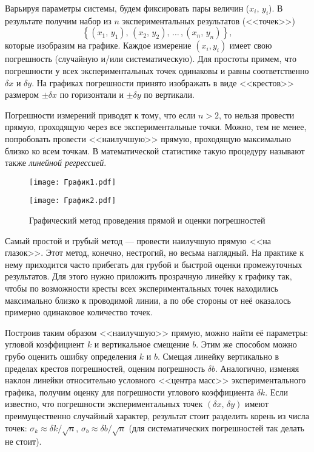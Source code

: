 \documentclass[10pt]{article}
\begin{document}
Варьируя параметры системы, будем фиксировать пары величин ($x_{i},\,y_{i}$).
В результате получим набор из $n$ экспериментальных результатов (<<точек>>)
\[
\left\{ (x_{1},\,y_{1}),\,(x_{2},\,y_{2}),\,\ldots\,,(x_{n},\,y_{n})\right\} ,
\]
которые изобразим на графике. Каждое измерение $\left(x_{i},y_{i}\right)$
имеет свою погрешность (случайную и/или систематическую). Для простоты
примем, что погрешности у всех экспериментальных точек одинаковы и
равны соответственно $\delta x$ и $\delta y$. На графиках погрешности
принято изображать в виде <<крестов>> размером
$\pm\delta x$ по горизонтали и $\pm\delta y$ по вертикали.

Погрешности измерений приводят к тому, что если $n>2$, то нельзя
провести прямую, проходящую через все экспериментальные точки. Можно,
тем не менее, попробовать провести <<наилучшую>>
прямую, проходящую максимально близко ко всем точкам. В математической
статистике такую процедуру называют также \emph{линейной регрессией}.

\begin{figure}[th]
\begin{minipage}[t]{0.5\columnwidth}%
\texttt{[image: График1.pdf]}%
\end{minipage}%
\begin{minipage}[t]{0.5\columnwidth}%
\texttt{[image: График2.pdf]}%
\end{minipage}

\caption{Графический метод проведения прямой и оценки погрешностей}
\end{figure}

Самый простой и грубый метод --- провести наилучшую прямую
<<на глазок>>. Этот метод, конечно, нестрогий,
но весьма наглядный. На практике к нему приходится часто прибегать
для грубой и быстрой оценки промежуточных результатов. Для этого нужно
приложить прозрачную линейку к графику так, чтобы по возможности кресты
всех экспериментальных точек находились максимально близко к проводимой
линии, а по обе стороны от неё оказалось примерно одинаковое количество
точек. 

Построив таким образом <<наилучшую>> прямую,
можно найти её параметры: угловой коэффициент $k$ и вертикальное
смещение $b$. Этим же способом можно грубо оценить ошибку определения
$k$ и $b$. Смещая линейку вертикально в пределах крестов погрешностей,
оценим погрешность $\delta b$. Аналогично, изменяя наклон линейки
относительно условного <<центра масс>>
экспериментального графика, получим оценку для погрешности углового
коэффициента $\delta k$. Если известно, что погрешности экспериментальных
точек $\left(\delta x,\,\delta y\right)$ имеют преимущественно случайный
характер, результат стоит разделить корень из числа точек: $\sigma_{k}\approx\delta k/\sqrt{n}$,
$\sigma_{b}\approx\delta b/\sqrt{n}$ (для систематических погрешностей
так делать не стоит).
\end{document}
